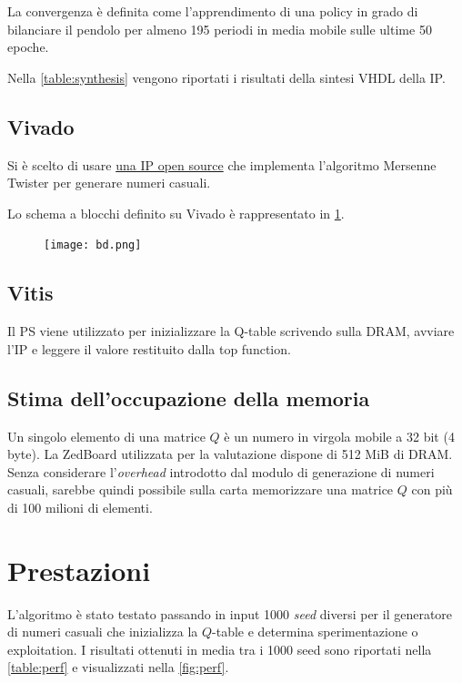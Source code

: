 \documentclass{article}
\begin{document}
La convergenza è definita come l'apprendimento di una policy in grado di bilanciare il pendolo per almeno 195 periodi in media mobile sulle ultime 50 epoche. 

Nella \cref{table:synthesis} vengono riportati i risultati della sintesi VHDL della IP.

\begin{table}[h!]
\label{table:synthesis}
\end{table}
\subsection{Vivado}
Si è scelto di usare \href{https://github.com/wfedorko/Mersenne-Twister-HLS}{una IP open source} che implementa l'algoritmo Mersenne Twister per generare numeri casuali. 

Lo schema a blocchi definito su Vivado è rappresentato in \cref{fig:bd}.
\begin{figure}[h!]

\centering


\texttt{[image: bd.png]}
\label{fig:bd}
\end{figure}

\subsection{Vitis}
Il PS viene utilizzato per inizializzare la Q-table scrivendo sulla DRAM, avviare l'IP e leggere il valore restituito dalla top function. 

\subsection{Stima dell'occupazione della memoria}
Un singolo elemento di una matrice $Q$ è un numero in virgola mobile a 32 bit (4 byte).
La ZedBoard utilizzata per la valutazione dispone di 512 MiB di DRAM.
Senza considerare l'\emph{overhead} introdotto dal modulo di generazione di numeri casuali, sarebbe quindi possibile sulla carta memorizzare una matrice $Q$ con più di 100 milioni di elementi. 

\section{Prestazioni}
L'algoritmo è stato testato passando in input 1000 \emph{seed} diversi per il generatore di numeri casuali che inizializza la $Q$-table e determina sperimentazione o exploitation.
I risultati ottenuti in media tra i 1000 seed sono riportati nella \cref{table:perf} e visualizzati nella \cref{fig:perf}.
\end{document}
